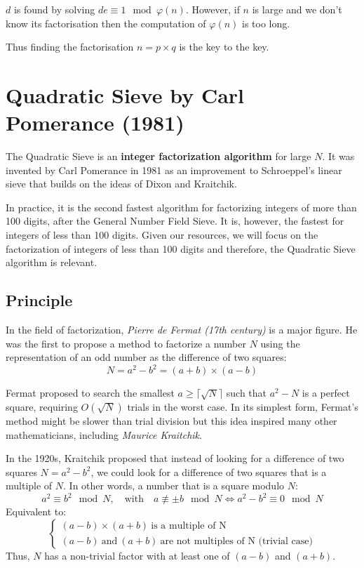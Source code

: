 \documentclass[a4paper, 11pt]{article}
\begin{document}
$d$ is found by solving $de \equiv 1 \mod \varphi(n)$. However, if $n$ is large and we don't know its factorisation then the computation of $\varphi(n)$ is too long.

Thus finding the factorisation $n = p \times q$ is the key to the key.

\section{Quadratic Sieve by Carl Pomerance (1981)}

The Quadratic Sieve \cite{Pomerance1985QuadraticSieve} is an \textbf{integer factorization algorithm} for large $N$. It was invented by Carl Pomerance in 1981 as an improvement to Schroeppel's linear sieve that builds on the ideas of Dixon and Kraitchik.

In practice, it is the second fastest algorithm for factorizing integers of more than 100 digits, after the General Number Field Sieve. It is, however, the fastest for integers of less than 100 digits. Given our resources, we will focus on the factorization of integers of less than 100 digits and therefore, the Quadratic Sieve algorithm is relevant.


\subsection{Principle}
In the field of factorization, \textit{Pierre de Fermat (17th century)} is a
major figure. He was the first to propose a method to factorize a number $N$
using the representation of an odd number as the difference of two squares:
\begin{equation}
    N = a^2 - b^2 = (a + b) \times (a - b)
\end{equation}

Fermat proposed to search the smallest $a \geq \lceil \sqrt{N} \rceil$ such that $a^2 - N$ is a perfect square, requiring $O(\sqrt{N})$ trials in the worst case. In its simplest form, Fermat's method might be slower than trial division but this idea inspired many other mathematicians, including \textit{Maurice Kraitchik}.

In the 1920s, Kraitchik proposed that instead of looking for a difference of
two squares $N = a^2 - b^2$, we could look for a difference of two squares that
is a multiple of $N$. In other words, a number that is a square modulo $N$:
\begin{equation}
    a^2 \equiv b^2 \mod{N}, \quad \text{with} \quad a \not\equiv \pm b \mod{N} \iff a^2 - b^2 \equiv 0 \mod{N}
\end{equation}
Equivalent to:
\begin{equation}
    \left\{
    \begin{array}{ll}
        (a - b) \times (a + b) \ \text{is a multiple of N} \\
        (a-b) \ \text{and} \ (a+b) \ \text{are not multiples of N (trivial case)}
    \end{array}
    \right.
\end{equation}
Thus, $N$ has a non-trivial factor with at least one of $(a-b)$ and $(a+b).$
\end{document}
